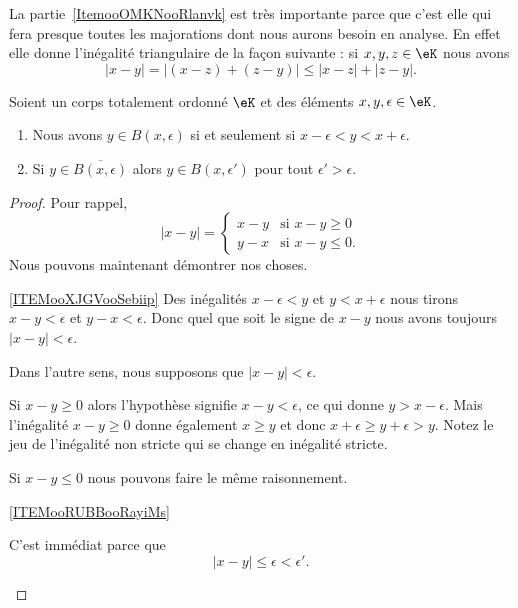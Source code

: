 \begin{remark}      \label{RemooJCAUooKkuglX}
    La partie~\ref{ItemooOMKNooRlanvk} est très importante parce que c'est elle qui fera presque toutes les majorations dont nous aurons besoin en analyse. En effet elle donne l'inégalité triangulaire de la façon suivante : si \( x,y,z\in \eK\) nous avons
    \begin{equation}
        | x-y |= |  (x-z)+(z-y) |\leq | x-z |+| z-y |.
    \end{equation}
\end{remark}

\begin{lemma}
    Soient un corps totalement ordonné \( \eK\) et des éléments \( x,y,\epsilon\in \eK\).
    \begin{enumerate}
        \item       \label{ITEMooXJGVooSebiip}
            Nous avons \( y\in B(x,\epsilon)\) si et seulement si \( x-\epsilon<y<x+\epsilon\).
        \item       \label{ITEMooRUBBooRayiMs}
            Si \( y\in  \overline{ B(x,\epsilon) }  \) alors \( y\in B(x,\epsilon')\) pour tout \( \epsilon'>\epsilon\).
    \end{enumerate}
\end{lemma}

\begin{proof}
    Pour rappel,
    \begin{equation}
        | x-y |=\begin{cases}
               x-y    &     \text{si } x-y\geq 0 \\
                    y-x    &    \text{si } x-y\leq 0.
               \end{cases}
    \end{equation}
    Nous pouvons maintenant démontrer nos choses.
    \begin{subproof}
        \item[\ref{ITEMooXJGVooSebiip}]
            Des inégalités \( x-\epsilon<y\) et \( y<x+\epsilon\) nous tirons \( x-y<\epsilon\) et \( y-x<\epsilon\). Donc quel que soit le signe de \( x-y\) nous avons toujours \( | x-y |<\epsilon\).

            Dans l'autre sens, nous supposons que \( | x-y |<\epsilon\).

            Si \( x-y\geq 0\) alors l'hypothèse signifie \( x-y<\epsilon\), ce qui donne \( y>x-\epsilon\). Mais l'inégalité \( x-y\geq 0\) donne également \( x\geq y\) et donc \( x+\epsilon\geq y+\epsilon>y\). Notez le jeu de l'inégalité non stricte qui se change en inégalité stricte.

            Si \( x-y\leq 0\) nous pouvons faire le même raisonnement.

        \item[\ref{ITEMooRUBBooRayiMs}]

            C'est immédiat parce que
            \begin{equation}
                | x-y |\leq \epsilon<\epsilon'.
            \end{equation}
    \end{subproof}
\end{proof}

